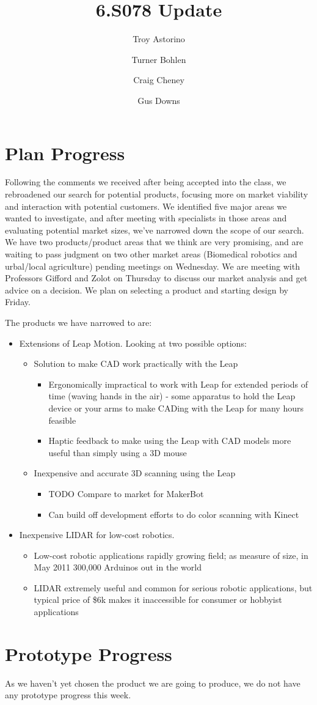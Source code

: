 \documentclass{article}
\title{\vspace{-4em}6.S078 Update}
\author{Troy Astorino \and Turner Bohlen \and Craig Cheney \and Gus Downs}
\begin{document}
\maketitle

\section{Plan Progress}
Following the comments we received after being accepted into the class, we
rebroadened our search for potential products, focusing more on market viability
and interaction with potential customers.  We identified five major areas we
wanted to investigate, and after meeting with specialists in those
areas and evaluating potential market sizes, we've narrowed down the scope of
our search. We have two products/product areas that we think are very promising,
and are waiting to pass judgment on two other market areas (Biomedical robotics
and urbal/local agriculture) pending meetings on
Wednesday. We are meeting with Professors Gifford and Zolot on Thursday
to discuss our market analysis and get advice on a decision. We plan on
selecting a product and starting design by Friday. 

The products we have narrowed to are:
\begin{itemize}
\item Extensions of Leap Motion. Looking at two possible options:
\begin{itemize}
\item Solution to make CAD work practically with the Leap
\begin{itemize}
\item Ergonomically impractical to work with Leap for extended periods of time
  (waving hands in the air) - some apparatus to hold the Leap device or your
  arms to make CADing with the Leap for many hours feasible
\item Haptic feedback to make using the Leap with CAD models more useful than
  simply using a 3D mouse
\end{itemize}
\item Inexpensive and accurate 3D scanning using the Leap
\begin{itemize}
\item TODO Compare to market for MakerBot
\item Can build off development efforts to do color scanning with Kinect
\end{itemize}
\end{itemize}

\item Inexpensive LIDAR for low-cost robotics. 
\begin{itemize}
\item Low-cost robotic applications rapidly growing field; as measure of size,
  in May 2011 300,000 Arduinos out in the world
\item LIDAR extremely useful and common for serious robotic applications, but
  typical price of \$6k makes it inaccessible for consumer or hobbyist applications
\end{itemize}
\end{itemize}



\section{Prototype Progress}
As we haven't yet chosen the product we are going to produce, we do not have any
prototype progress this week. 
\end{document}

